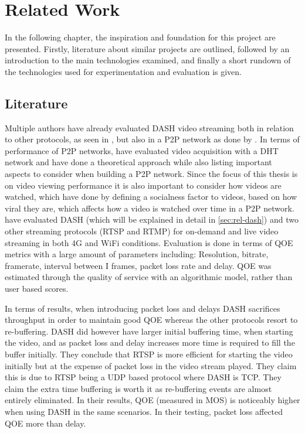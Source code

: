 \chapter{Related Work}
\label{cha:related-work}
In the following chapter, the inspiration and foundation for this project are presented. Firstly, literature about similar projects are outlined, followed by an introduction to the main technologies examined, and finally a short rundown of the technologies used for experimentation and evaluation is given. 

\section{Literature}
Multiple authors have already evaluated \ac{DASH} video streaming both in relation to other protocols, as seen in \citet{aloman2015performance}, but also in a \ac{P2P} network as done by \citet{gazdar2017toward}. In terms of performance of \ac{P2P} networks, \citet{nguyen2009p2p} have evaluated video acquisition with a \ac{DHT} network and \citet{qiu2004modeling} have done a theoretical approach while also listing important aspects to consider when building a \ac{P2P} network. Since the focus of this thesis is on video viewing performance it is also important to consider how videos are watched, which \citet{broxton2013catching} have done by defining a socialness factor to videos, based on how viral they are, which affects how a video is watched over time in a \ac{P2P} network.
\\


\citet{aloman2015performance} have evaluated \ac{DASH} (which will be explained in detail in \autoref{sec:rel-dash}) and two other streaming protocols (\ac{RTSP} and \ac{RTMP}) for on-demand and live video streaming in both 4G and WiFi conditions. Evaluation is done in terms of \ac{QOE} metrics with a large amount of parameters including: Resolution, bitrate, framerate, interval between I frames, packet loss rate and delay. \ac{QOE} was estimated through the quality of service with an algorithmic model, rather than user based scores.

In terms of results, when introducing packet loss and delays \ac{DASH} sacrifices throughput in order to maintain good \ac{QOE} whereas the other protocols resort to re-buffering. \ac{DASH} did however have larger initial buffering time, when starting the video, and as packet loss and delay increases more time is required to fill the buffer initially. They conclude that \ac{RTSP} is more efficient for starting the video initially but at the expense of packet loss in the video stream played. They claim this is due to \ac{RTSP} being a \ac{UDP} based protocol where \ac{DASH} is \ac{TCP}. They claim the extra time buffering is worth it as re-buffering events are almost entirely eliminated. In their results, \ac{QOE} (measured in \ac{MOS}) is noticeably higher when using \ac{DASH} in the same scenarios. In their testing, packet loss affected \ac{QOE} more than delay.
\\


